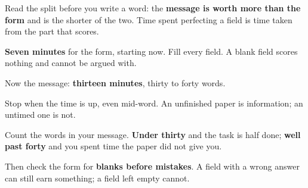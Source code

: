 Read the split before you write a word: the \textbf{message is worth more than the form} and is the shorter of the two. Time spent perfecting a field is time taken from the part that scores.

\textbf{Seven minutes} for the form, starting now. Fill every field. A blank field scores nothing and cannot be argued with.

Now the message: \textbf{thirteen minutes}, thirty to forty words.

Stop when the time is up, even mid-word. An unfinished paper is information; an untimed one is not.

\begin{tcolorbox}[breakable,colback=teal!4,colframe=teal!35!black,title={Before you move on}]
Count the words in your message. \textbf{Under thirty} and the task is half done; \textbf{well past forty} and you spent time the paper did not give you.

Then check the form for \textbf{blanks before mistakes}. A field with a wrong answer can still earn something; a field left empty cannot.
\end{tcolorbox}
